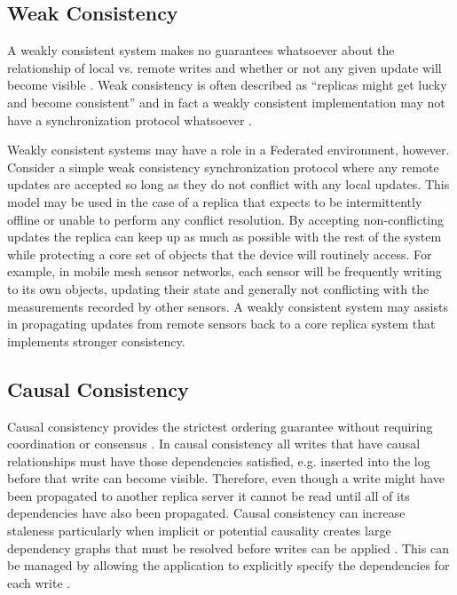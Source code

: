 \subsection{Weak Consistency}

A weakly consistent system makes no guarantees whatsoever about the relationship of local vs. remote writes and whether or not any given update will become visible \cite{vogels_eventually_2009}. Weak consistency is often described as ``replicas might get lucky and become consistent'' and in fact a weakly consistent implementation may not have a synchronization protocol whatsoever \cite{bermbach_consistency_2013}.

Weakly consistent systems may have a role in a Federated environment, however. Consider a simple weak consistency synchronization protocol where any remote updates are accepted so long as they do not conflict with any local updates. This model may be used in the case of a replica that expects to be intermittently offline or unable to perform any conflict resolution. By accepting non-conflicting updates the replica can keep up as much as possible with the rest of the system while protecting a core set of objects that the device will routinely access. For example, in mobile mesh sensor networks, each sensor will be frequently writing to its own objects, updating their state and generally not conflicting with the measurements recorded by other sensors. A weakly consistent system may assists in propagating updates from remote sensors back to a core replica system that implements stronger consistency.

\subsection{Causal Consistency}

Causal consistency provides the strictest ordering guarantee without requiring coordination or consensus \cite{ladin_providing_1992}. In causal consistency all writes that have causal relationships must have those dependencies satisfied, e.g. inserted into the log before that write can become visible. Therefore, even though a write might have been propagated to another replica server it cannot be read until all of its dependencies have also been propagated. Causal consistency can increase staleness particularly when implicit or potential causality creates large dependency graphs that must be resolved before writes can be applied \cite{lloyd_dont_2011}. This can be managed by allowing the application to explicitly specify the dependencies for each write \cite{bailis_potential_2012}.

